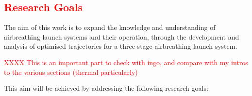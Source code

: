   	   

  	  	
  	  	
\textcolor{red}{
  \section{Research Goals}
}
\noindent
    The aim of this work is to expand the knowledge and understanding of airbreathing launch systems and their operation, through the development and analysis of optimised trajectories for a three-stage airbreathing launch system. 
 
 \textcolor{red}{XXXX This is an important part to check with ingo, and compare with my intros to the various sections (thermal particularly)}
    
\vspace*{10pt}
    \noindent This aim will be achieved by addressing the following research goals:
